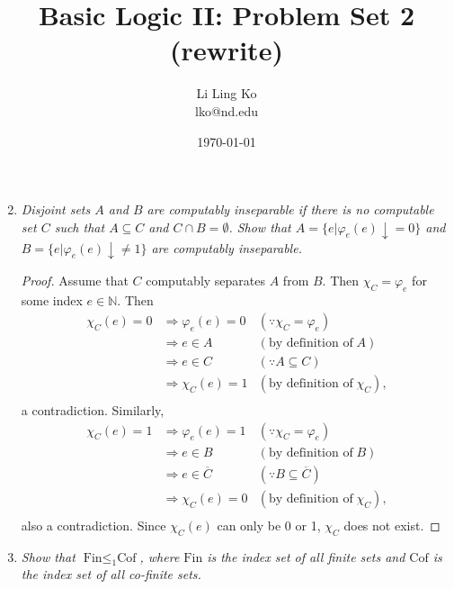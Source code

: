 \documentclass{article}
\begin{document}
\title{Basic Logic II: Problem Set 2 (rewrite)}
\author{Li Ling Ko\\ lko@nd.edu}
\date{\today}
\maketitle

\begin{enumerate}[label={\bf Q\arabic*:}]
  \setcounter{enumi}{1}
  \item \it Disjoint sets $A$ and $B$ are computably inseparable if there
    is no computable set $C$ such that $A\subseteq C$ and $C\cap
    B=\emptyset$. Show that $A=\{e|\varphi_e(e)\downarrow=0\}$ and
    $B=\{e|\varphi_e(e)\downarrow\neq1\}$ are computably inseparable.

    \begin{proof}
      Assume that $C$ computably separates $A$ from $B$. Then
      $\chi_C=\varphi_e$ for some index $e\in\mathbb{N}$. Then
      \begin{align*}
        \chi_C(e)=0 &\Rightarrow \varphi_e(e)=0 &(\because
          \chi_C=\varphi_e)\\
        &\Rightarrow e\in A &(\text{by definition of}\; A)\\
        &\Rightarrow e\in C &(\because A\subseteq C)\\
        &\Rightarrow \chi_C(e)=1 &(\text{by definition of}\; \chi_C),\\
      \end{align*}
      a contradiction. Similarly,
      \begin{align*}
        \chi_C(e)=1 &\Rightarrow \varphi_e(e)=1 &(\because
          \chi_C=\varphi_e)\\
        &\Rightarrow e\in B &(\text{by definition of}\; B)\\
        &\Rightarrow e\in \overline{C} &(\because B\subseteq
          \overline{C})\\
        &\Rightarrow \chi_C(e)=0 &(\text{by definition of}\; \chi_C),\\
      \end{align*}
      also a contradiction. Since $\chi_C(e)$ can only be 0 or 1, $\chi_C$
      does not exist.
    \end{proof}

  \item \it Show that $\text{Fin}\leq_1\text{Cof}$, where $\text{Fin}$ is
    the index set of all finite sets and $\text{Cof}$ is the index set of
    all co-finite sets.


\end{enumerate}
\end{document}
